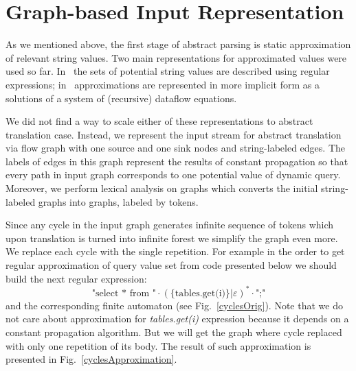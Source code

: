 \section{Graph-based Input Representation}

As we mentioned above, the first stage of abstract parsing is static approximation
of relevant string values. Two main representations for approximated values were
used so far. In~\cite{StringExpr,ALVOR1,ALVOR2} the sets of potential string values 
are described using regular expressions; in~\cite{AbstrParsing} approximations are
represented in more implicit form as a solutions of a system of (recursive) dataflow 
equations. 

We did not find a way to scale either of these representations to abstract translation case. 
Instead, we represent the input stream for abstract translation via flow graph with one source and
one sink nodes and string-labeled edges. The labels of edges in this graph represent the results 
of constant propagation so that every path in input graph corresponds to one potential value of dynamic query. 
Moreover, we perform lexical analysis on graphs which converts the initial string-labeled graphs into
graphs, labeled by tokens.


Since any cycle in the input graph generates infinite sequence of tokens which upon translation is turned 
into infinite forest we simplify the graph even more. We replace each cycle with the single repetition. For example in the order to get regular approximation of query value set from code presented below we should build the next regular expression:
$$\text{"select * from "} \cdot (\text{\{tables.get(i)\}}|\varepsilon)^* \cdot \text{";"}$$
and the corresponding finite automaton (see Fig.~\ref{cyclesOrig}). Note that we do not care about approximation for \textit{tables.get(i)} expression because it depends on a constant propagation algorithm. But we will get the graph where cycle replaced with only one repetition of its body. The result of such approximation is presented in Fig.~\ref{cyclesApproximation}.

